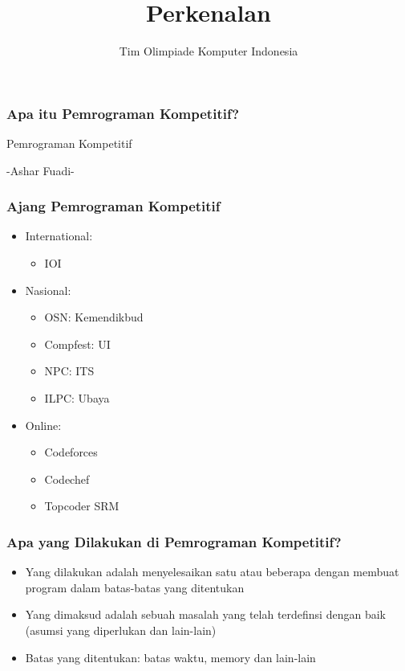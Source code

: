 

\title{Perkenalan}
\author{Tim Olimpiade Komputer Indonesia}
\date{}



\begin{frame}
\titlepage
\end{frame}

\begin{frame}
\frametitle{Apa itu Pemrograman Kompetitif?}
\begin{block}{Pemrograman Kompetitif}

-Ashar Fuadi-
\end{block}
\end{frame}

\begin{frame}
\frametitle{Ajang Pemrograman Kompetitif}
\begin{itemize}
  \item International:
    \begin{itemize}
    	\item IOI
    \end{itemize}
  \item Nasional:
    \begin{itemize}
    	\item OSN: Kemendikbud
    	\item Compfest: UI
    	\item NPC: ITS
    	\item ILPC: Ubaya
    \end{itemize} 
  \item Online:
    \begin{itemize}
      \item Codeforces
      \item Codechef
      \item Topcoder SRM
    \end{itemize}
\end{itemize}

\end{frame}

\begin{frame}
\frametitle{Apa yang Dilakukan di Pemrograman Kompetitif?}
\begin{itemize}
  \item Yang dilakukan adalah menyelesaikan satu atau beberapa  dengan membuat program dalam batas-batas yang ditentukan
  \item Yang dimaksud  adalah sebuah masalah yang telah terdefinsi dengan baik (asumsi yang diperlukan dan lain-lain)
  \item Batas yang ditentukan: batas waktu, memory dan lain-lain
\end{itemize}
\end{frame}

